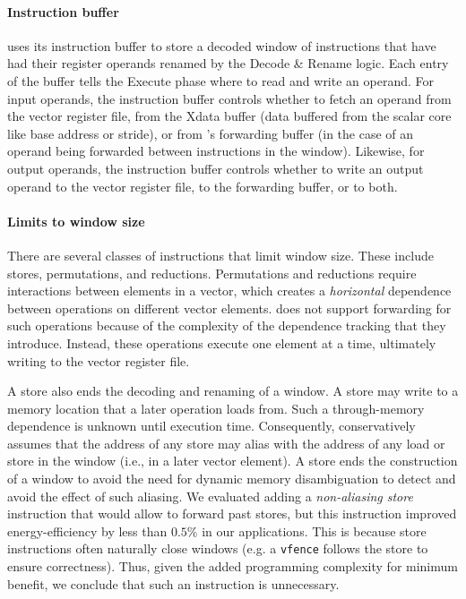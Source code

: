 \paragraph{Instruction buffer}
\manic uses its instruction buffer to store a decoded window of
instructions that have had their register operands renamed by the Decode \& Rename logic.
% 
Each entry of the buffer tells the Execute phase where to read and write an operand.
% 
For input operands, the instruction buffer controls whether to fetch an operand from the
vector register file, from the Xdata buffer (data buffered from the scalar core like base address or stride), or from \manic's forwarding buffer (in the case of an
operand being forwarded between instructions in the window).
%
Likewise, for output operands, the instruction buffer controls whether to write
an output operand to the vector register file, to the forwarding buffer, or to both.

\paragraph{Limits to window size}
There are several classes of instructions that limit window size.
%
These include stores, permutations, and reductions.
%
Permutations and reductions require interactions between elements in a vector, which
creates a {\em horizontal} dependence between operations on different vector elements.
%
\manic does not support forwarding for such operations because of the complexity of
the dependence tracking that they introduce.  
% 
Instead, these operations execute one element at a time, ultimately writing to the vector register file. 

A store also ends the decoding and renaming of a window.  A store may write to a memory
location that a later operation loads from. Such a through-memory dependence is 
unknown until execution time.  Consequently, \manic conservatively assumes
that the address of any store may alias with the address of any load or store in the window (i.e., in a later vector element).
A store ends the construction of a window to avoid the need for dynamic memory disambiguation to
detect and avoid the effect of such aliasing.
% 
We evaluated adding a \emph{non-aliasing store} instruction that would allow \manic to forward past stores,
but this instruction improved energy-efficiency by less than $0.5\%$ in our applications.
% 
This is because store instructions often naturally close windows (e.g. a {\tt vfence} follows the store to ensure correctness).
% 
Thus, given the added programming complexity for minimum benefit, we conclude that such an instruction is unnecessary.
%

